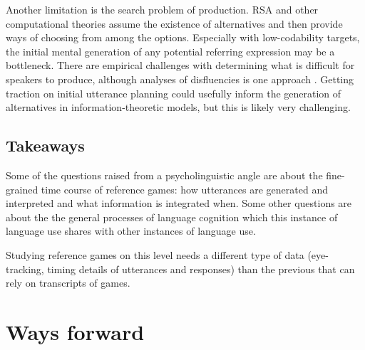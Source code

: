 \documentclass[]{article}
\begin{document}
Another limitation is the search problem of production. RSA and other computational theories assume the existence of alternatives and then provide ways of choosing from among the options. Especially with low-codability targets, the initial mental generation of any potential referring expression may be a bottleneck. There are empirical challenges with determining what is difficult for speakers to produce, although analyses of disfluencies is one approach \citep{yoon2014}.  Getting traction on initial utterance planning could usefully inform the generation of alternatives in information-theoretic models, but this is likely very challenging. 

\subsection{Takeaways}

Some of the questions raised from a psycholinguistic angle are about the fine-grained time course of reference games: how utterances are generated and interpreted and what information is integrated when. Some other questions are about the the general processes of language cognition which this instance of language use shares with other instances of language use.

Studying reference games on this level needs a different type of data (eye-tracking, timing details of utterances and responses) than the previous that can rely on transcripts of games. 

\section{Ways forward}



	
\end{document}
